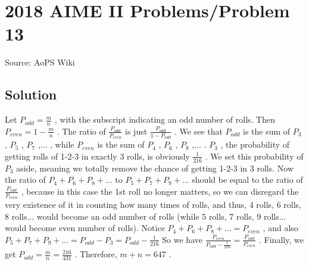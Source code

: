 \documentclass[12pt]{article}
\begin{document}
\section*{{2018 AIME II Problems/Problem 13}}
Source: AoPS Wiki

\subsection*{Solution}
Let $P_{odd}=\frac{m}{n}$ , with the subscript indicating an odd number of rolls. Then $P_{even}=1-\frac{m}{n}$ . The ratio of $\frac{P_{odd}}{P_{even}}$ is just $\frac{P_{odd}}{1-P_{odd}}$ . We see that $P_{odd}$ is the sum of $P_3$ , $P_5$ , $P_7$ ,... , while $P_{even}$ is the sum of $P_4$ , $P_6$ , $P_8$ ,... . $P_3$ , the probability of getting rolls of 1-2-3 in exactly 3 rolls, is obviously $\frac{1}{216}$ . We set this probability of $P_3$ aside, meaning we totally remove the chance of getting 1-2-3 in 3 rolls. Now the ratio of $P_4+P_6+P_8+...$ to $P_5+P_7+P_9+...$ should be equal to the ratio of $\frac{P_{odd}}{P_{even}}$ , because in this case the 1st roll no longer matters, so we can disregard the very existence of it in counting how many times of rolls, and thus, 4 rolls, 6 rolls, 8 rolls... would become an odd number of rolls (while 5 rolls, 7 rolls, 9 rolls... would become even number of rolls). Notice $P_4+P_6+P_8+...=P_{even}$ , and also $P_5+P_7+P_9+...=P_{odd}-P_3=P_{odd}-\frac{1}{216}$ So we have $\frac{P_{even}}{P_{odd}-\frac{1}{216}}=\frac{P_{odd}}{P_{even}}$ . Finally, we get $P_{odd}=\frac{m}{n}=\frac{216}{431}$ .
Therefore, $m+n = \boxed{647}$ .
\end{document}

